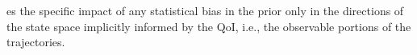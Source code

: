 \documentclass[final,1p,times]{elsarticle}
\begin{document}
es the specific impact of any statistical bias in the prior only in the directions of the state space implicitly informed by the QoI, i.e., the observable portions of the trajectories. 

\end{document}
